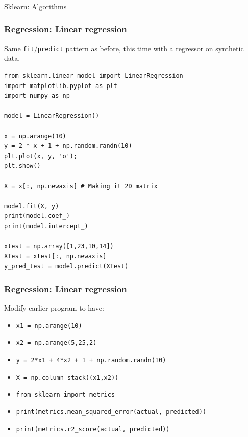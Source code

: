 
\begin{frame}[fragile]\frametitle{}
\begin{center}
{\Large Sklearn: Algorithms}
\end{center}
\end{frame}

\begin{frame}[fragile]\frametitle{Regression: Linear regression}
Same \texttt{fit}/\texttt{predict} pattern as before, this time with a regressor on synthetic data.
\begin{lstlisting}
from sklearn.linear_model import LinearRegression
import matplotlib.pyplot as plt
import numpy as np

model = LinearRegression()

x = np.arange(10)
y = 2 * x + 1 + np.random.randn(10)
plt.plot(x, y, 'o');
plt.show()

X = x[:, np.newaxis] # Making it 2D matrix

model.fit(X, y)
print(model.coef_)
print(model.intercept_)

xtest = np.array([1,23,10,14])
XTest = xtest[:, np.newaxis]
y_pred_test = model.predict(XTest)
\end{lstlisting}
\end{frame}


\begin{frame}[fragile]\frametitle{Regression: Linear regression}
Modify earlier program to have:
\begin{itemize}
\item \lstinline|x1 = np.arange(10)|
\item \lstinline|x2 = np.arange(5,25,2)|
\item \lstinline|y = 2*x1 + 4*x2 + 1 + np.random.randn(10) |
\item \lstinline|X = np.column_stack((x1,x2)) |
\item \lstinline|from sklearn import metrics|
\item \lstinline|print(metrics.mean_squared_error(actual, predicted))|
\item \lstinline|print(metrics.r2_score(actual, predicted))|
\end{itemize}
\end{frame}


